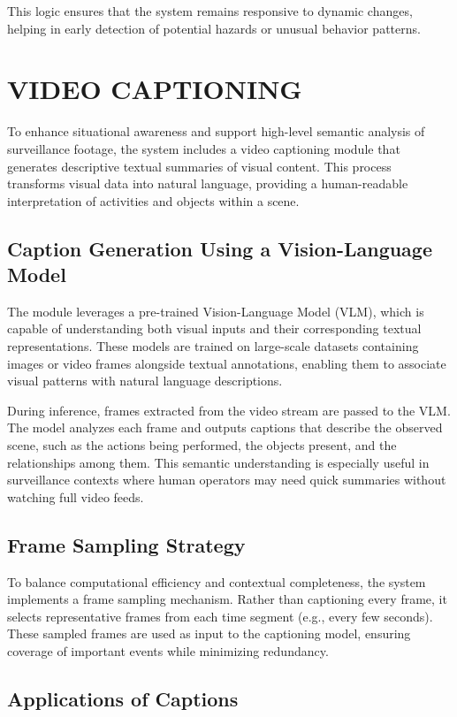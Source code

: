 This logic ensures that the system remains responsive to dynamic changes, helping in early detection of potential hazards or unusual behavior patterns.

\section{\MakeUppercase{Video Captioning}}

To enhance situational awareness and support high-level semantic analysis of surveillance footage, the system includes a video captioning module that generates descriptive textual summaries of visual content. This process transforms visual data into natural language, providing a human-readable interpretation of activities and objects within a scene.

\subsection{Caption Generation Using a Vision-Language Model}

The module leverages a pre-trained Vision-Language Model (VLM), which is capable of understanding both visual inputs and their corresponding textual representations. These models are trained on large-scale datasets containing images or video frames alongside textual annotations, enabling them to associate visual patterns with natural language descriptions.

During inference, frames extracted from the video stream are passed to the VLM. The model analyzes each frame and outputs captions that describe the observed scene, such as the actions being performed, the objects present, and the relationships among them. This semantic understanding is especially useful in surveillance contexts where human operators may need quick summaries without watching full video feeds.

\subsection{Frame Sampling Strategy}

To balance computational efficiency and contextual completeness, the system implements a frame sampling mechanism. Rather than captioning every frame, it selects representative frames from each time segment (e.g., every few seconds). These sampled frames are used as input to the captioning model, ensuring coverage of important events while minimizing redundancy.

\subsection{Applications of Captions}

